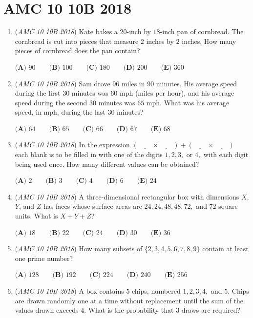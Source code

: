 \section{AMC 10 10B 2018}
        \begin{enumerate}
        	\item (\textit{AMC 10 10B 2018}) Kate bakes a $20$-inch by $18$-inch pan of cornbread. The cornbread is cut into pieces that measure $2$ inches by $2$ inches. How many pieces of cornbread does the pan contain?


 $\textbf{(A) } 90 \qquad \textbf{(B) } 100 \qquad \textbf{(C) } 180 \qquad \textbf{(D) } 200 \qquad \textbf{(E) } 360$


	\item (\textit{AMC 10 10B 2018}) Sam drove $96$ miles in $90$ minutes. His average speed during the first $30$ minutes was $60$ mph (miles per hour), and his average speed during the second $30$ minutes was $65$ mph. What was his average speed, in mph, during the last $30$ minutes?


 $\textbf{(A) } 64 \qquad \textbf{(B) } 65 \qquad \textbf{(C) } 66 \qquad \textbf{(D) } 67 \qquad \textbf{(E) } 68$


	\item (\textit{AMC 10 10B 2018}) In the expression $\left(\underline{\qquad}\times\underline{\qquad}\right)+\left(\underline{\qquad}\times\underline{\qquad}\right)$ each blank is to be filled in with one of the digits $1,2,3,$ or $4,$ with each digit being used once. How many different values can be obtained?


 $\textbf{(A) }2 \qquad \textbf{(B) }3 \qquad \textbf{(C) }4 \qquad \textbf{(D) }6 \qquad \textbf{(E) }24 \qquad$


	\item (\textit{AMC 10 10B 2018}) A three-dimensional rectangular box with dimensions $X$, $Y$, and $Z$ has faces whose surface areas are $24, 24, 48, 48, 72,$ and $72$ square units. What is $X+Y+Z$?


 $\textbf{(A) }18 \qquad \textbf{(B) }22 \qquad \textbf{(C) }24 \qquad \textbf{(D) }30 \qquad \textbf{(E) }36 \qquad$


	\item (\textit{AMC 10 10B 2018}) How many subsets of $\{2,3,4,5,6,7,8,9\}$ contain at least one prime number?


 $\textbf{(A) }128 \qquad \textbf{(B) }192 \qquad \textbf{(C) }224 \qquad \textbf{(D) }240 \qquad \textbf{(E) }256 \qquad$


	\item (\textit{AMC 10 10B 2018}) A box contains $5$ chips, numbered $1, 2, 3, 4,$ and $5$. Chips are drawn randomly one at a time without replacement until the sum of the values drawn exceeds $4$. What is the probability that $3$ draws are required?



\end{enumerate}

